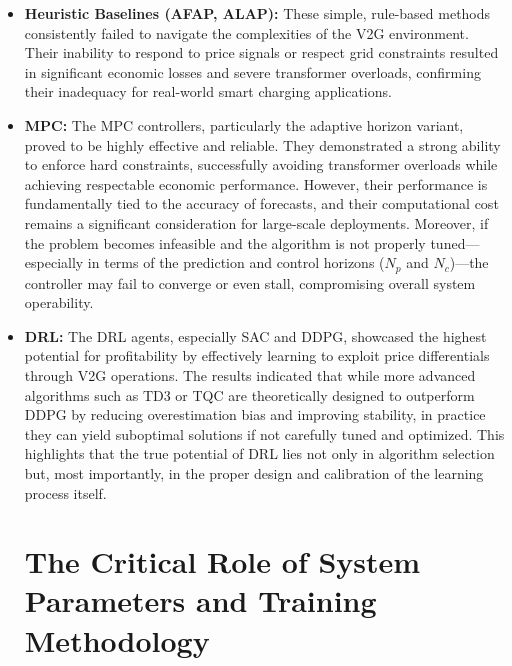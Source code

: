 \begin{itemize}
    \item \textbf{Heuristic Baselines (AFAP, ALAP):} These simple, rule-based methods consistently failed to navigate the complexities of the V2G environment. Their inability to respond to price signals or respect grid constraints resulted in significant economic losses and severe transformer overloads, confirming their inadequacy for real-world smart charging applications.

\item \textbf{MPC:} The MPC controllers, particularly the adaptive horizon variant, proved to be highly effective and reliable. They demonstrated a strong ability to enforce hard constraints, successfully avoiding transformer overloads while achieving respectable economic performance. However, their performance is fundamentally tied to the accuracy of forecasts, and their computational cost remains a significant consideration for large-scale deployments. Moreover, if the problem becomes infeasible and the algorithm is not properly tuned—especially in terms of the prediction and control horizons ($N_p$ and $N_c$)—the controller may fail to converge or even stall, compromising overall system operability.

\item \textbf{DRL:} The DRL agents, especially SAC and DDPG, showcased the highest potential for profitability by effectively learning to exploit price differentials through V2G operations. The results indicated that while more advanced algorithms such as TD3 or TQC are theoretically designed to outperform DDPG by reducing overestimation bias and improving stability, in practice they can yield suboptimal solutions if not carefully tuned and optimized. This highlights that the true potential of DRL lies not only in algorithm selection but, most importantly, in the proper design and calibration of the learning process itself.

\section{The Critical Role of System Parameters and Training Methodology}


\end{itemize}
